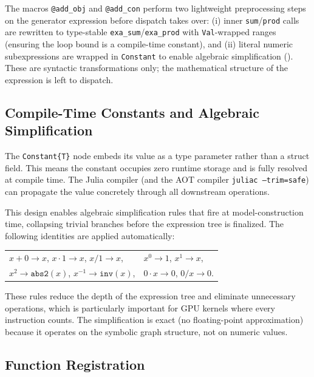\documentclass[11pt]{article}
\begin{document}
The macros \texttt{@add\_obj} and \texttt{@add\_con} perform two lightweight preprocessing steps on the generator expression before dispatch takes over: (i) inner \texttt{sum}/\texttt{prod} calls are rewritten to type-stable \texttt{exa\_sum}/\texttt{exa\_prod} with \texttt{Val}-wrapped ranges (ensuring the loop bound is a compile-time constant), and (ii) literal numeric subexpressions are wrapped in \texttt{Constant} to enable algebraic simplification (). These are syntactic transformations only; the mathematical structure of the expression is left to dispatch.

\subsection{Compile-Time Constants and Algebraic Simplification}
\label{sec:graph:constants}

The \texttt{Constant\{T\}} node embeds its value as a type parameter rather than a struct field. This means the constant occupies zero runtime storage and is fully resolved at compile time. The Julia compiler (and the AOT compiler \texttt{juliac --trim=safe}) can propagate the value concretely through all downstream operations.

This design enables algebraic simplification rules that fire at model-construction time, collapsing trivial branches before the expression tree is finalized. The following identities are applied automatically:
\begin{center}
\begin{tabular}{ll}
  $x + 0 \to x$, \quad $x \cdot 1 \to x$, \quad $x / 1 \to x$, & $x^0 \to 1$, \quad $x^1 \to x$, \\
  $x^2 \to \texttt{abs2}(x)$, \quad $x^{-1} \to \texttt{inv}(x)$, & $0 \cdot x \to 0$, \quad $0 / x \to 0$.
\end{tabular}
\end{center}
These rules reduce the depth of the expression tree and eliminate unnecessary operations, which is particularly important for GPU kernels where every instruction counts. The simplification is exact (no floating-point approximation) because it operates on the symbolic graph structure, not on numeric values.

\subsection{Function Registration}
\label{sec:graph:register}
\end{document}

